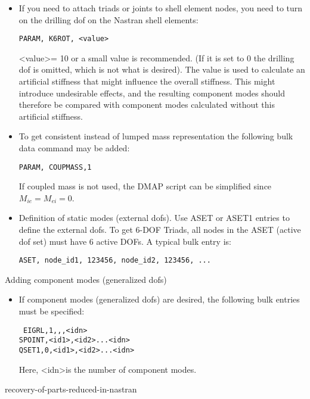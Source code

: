 \begin{itemize}
\item If you need to attach triads or joints to shell element nodes,
  you need to turn on the drilling dof on the Nastran shell elements:

  \texttt{PARAM, K6ROT, \textless value\textgreater}

  \textless value\textgreater = 10 or a small value is recommended.
  (If it is set to 0 the drilling dof is omitted, which is not what is desired).
  The value is used to calculate an artificial stiffness that might influence
  the overall stiffness. This might introduce undesirable effects,
  and the resulting component modes should therefore be compared with component
  modes calculated without this artificial stiffness.

\item To get consistent instead of lumped mass representation
  the following bulk data command may be added:

  \texttt{PARAM, COUPMASS,1}

  If coupled mass is not used, the DMAP script can be simplified since
  $M_{ie} = M_{ei} = 0$.

\item Definition of static modes (external dofs).
  Use ASET or ASET1 entries to define the external dofs. To get 6-DOF Triads,
  all nodes in the ASET (active dof set) must have 6 active DOFs.
  A typical bulk entry is:

  \texttt{ASET, node\_id1, 123456, node\_id2, 123456, ...}
\end{itemize}

Adding component modes (generalized dofs)

\begin{itemize}
\item If component modes (generalized dofs) are desired,
  the following bulk entries must be specified:

  \texttt{%
  EIGRL,1,,,\textless idn\textgreater \\
  SPOINT,\textless id1\textgreater,\textless id2\textgreater...\textless idn\textgreater \\
  QSET1,0,\textless id1\textgreater,\textless id2\textgreater...\textless idn\textgreater}

  Here, \textless idn\textgreater is the number of component modes.
\end{itemize}


           {recovery-of-parts-reduced-in-nastran}

